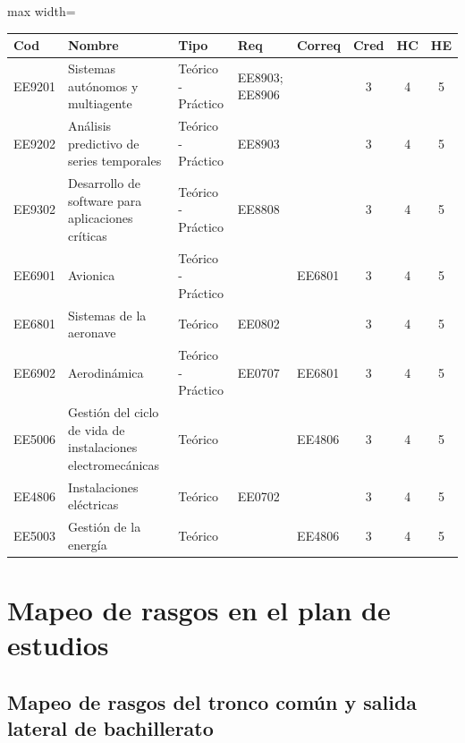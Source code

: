 \begin{center}
\small
\begin{adjustbox}{max width=\textwidth}
\begin{tabular}{|>{\RaggedRight\arraybackslash}p{1.25cm}|>{\RaggedRight\arraybackslash}p{5.2cm}|>{\RaggedRight\arraybackslash}p{1.65cm}|p{1.25cm}|p{1.25cm}|c|c|c|}
\hline
\rowcolor{grisEncabezado}
Cod & Nombre & Tipo & Req & Correq & Cred & HC & HE \\ \hline
EE9201 & Sistemas autónomos y multiagente & Teórico - Práctico & EE8903; EE8906 &  & 3 & 4 & 5 \\ \hline
\rowcolor{azulTabla}
EE9202 & Análisis predictivo de series temporales & Teórico - Práctico & EE8903 &  & 3 & 4 & 5 \\ \hline
EE9302 & Desarrollo de software para aplicaciones críticas & Teórico - Práctico & EE8808 &  & 3 & 4 & 5 \\ \hline
\rowcolor{azulTabla}
EE6901 & Avionica & Teórico - Práctico &  & EE6801 & 3 & 4 & 5 \\ \hline
EE6801 & Sistemas de la aeronave & Teórico & EE0802 &  & 3 & 4 & 5 \\ \hline
\rowcolor{azulTabla}
EE6902 & Aerodinámica & Teórico - Práctico & EE0707 & EE6801 & 3 & 4 & 5 \\ \hline
EE5006 & Gestión del ciclo de vida de instalaciones electromecánicas & Teórico &  & EE4806 & 3 & 4 & 5 \\ \hline
\rowcolor{azulTabla}
EE4806 & Instalaciones eléctricas & Teórico & EE0702 &  & 3 & 4 & 5 \\ \hline
EE5003 & Gestión de la energía & Teórico &  & EE4806 & 3 & 4 & 5 \\ \hline
\end{tabular}
\end{adjustbox}
\end{center}

\section*{Mapeo de rasgos en el plan de estudios}

\subsection*{Mapeo de rasgos del tronco común y salida lateral de bachillerato}

